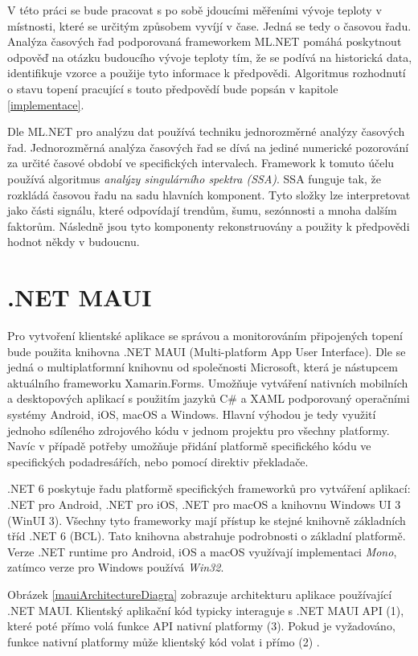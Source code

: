 V této práci se bude pracovat s po sobě jdoucími měřeními vývoje teploty v místnosti, které se určitým způsobem vyvíjí v čase. Jedná se tedy o časovou řadu. Analýza časových řad podporovaná frameworkem ML.NET pomáhá poskytnout odpověď na otázku budoucího vývoje teploty tím, že se podívá na historická data, identifikuje vzorce a použije tyto informace k předpovědi. Algoritmus rozhodnutí o stavu topení pracující s touto předpovědí bude popsán v kapitole \ref{implementace}.

Dle \cite{mlnet_tutorial} ML.NET pro analýzu dat používá techniku jednorozměrné analýzy časových řad. Jednorozměrná analýza časových řad se dívá na jediné numerické pozorování za určité časové období ve specifických intervalech. Framework k tomuto účelu používá algoritmus {\it analýzy singulárního spektra (SSA)}. SSA funguje tak, že rozkládá časovou řadu na sadu hlavních komponent. Tyto složky lze interpretovat jako části signálu, které odpovídají trendům, šumu, sezónnosti a mnoha dalším faktorům. Následně jsou tyto komponenty rekonstruovány a použity k předpovědi hodnot někdy v budoucnu.

\pagebreak

\section{.NET MAUI}
Pro vytvoření klientské aplikace se správou a monitorováním připojených topení bude použita knihovna .NET MAUI (Multi-platform App User Interface). Dle \cite{maui} se jedná o multiplatformní knihovnu od společnosti Microsoft, která je nástupcem aktuálního frameworku Xamarin.Forms. Umožňuje vytváření nativních mobilních a desktopových aplikací s použitím jazyků C\# a XAML podporovaný operačními systémy Android, iOS, macOS a Windows. Hlavní výhodou je tedy využití jednoho sdíleného zdrojového kódu v jednom projektu pro všechny platformy. Navíc v případě potřeby umožňuje přidání platformě specifického kódu ve specifických podadresářích, nebo pomocí direktiv překladače.

.NET 6 poskytuje řadu platformě specifických frameworků pro vytváření aplikací: .NET pro Android, .NET pro iOS, .NET pro macOS a knihovnu Windows UI 3 (WinUI 3). Všechny tyto frameworky mají přístup ke stejné knihovně základních tříd .NET 6 (BCL). Tato knihovna abstrahuje podrobnosti o základní platformě. Verze .NET runtime pro Android, iOS a macOS využívají implementaci {\it Mono}, zatímco verze pro Windows používá {\it Win32}.

Obrázek \ref{mauiArchitectureDiagra} zobrazuje architekturu aplikace používající .NET MAUI. Klientský aplikační kód typicky interaguje s .NET MAUI API (1), které poté přímo volá funkce API nativní platformy (3). Pokud je vyžadováno, funkce nativní platformy může klientský kód volat i přímo (2) \cite{maui}.

